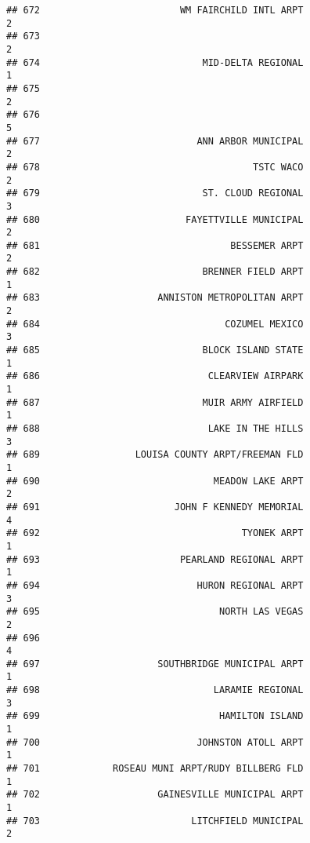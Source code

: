 \documentclass[
]{article}
\begin{document}
\begin{verbatim}
## 672                         WM FAIRCHILD INTL ARPT                           2
## 673                                                                          2
## 674                             MID-DELTA REGIONAL                           1
## 675                                                                          2
## 676                                                                          5
## 677                            ANN ARBOR MUNICIPAL                           2
## 678                                      TSTC WACO                           2
## 679                             ST. CLOUD REGIONAL                           3
## 680                          FAYETTVILLE MUNICIPAL                           2
## 681                                  BESSEMER ARPT                           2
## 682                             BRENNER FIELD ARPT                           1
## 683                     ANNISTON METROPOLITAN ARPT                           2
## 684                                 COZUMEL MEXICO                           3
## 685                             BLOCK ISLAND STATE                           1
## 686                              CLEARVIEW AIRPARK                           1
## 687                             MUIR ARMY AIRFIELD                           1
## 688                              LAKE IN THE HILLS                           3
## 689                 LOUISA COUNTY ARPT/FREEMAN FLD                           1
## 690                               MEADOW LAKE ARPT                           2
## 691                        JOHN F KENNEDY MEMORIAL                           4
## 692                                    TYONEK ARPT                           1
## 693                         PEARLAND REGIONAL ARPT                           1
## 694                            HURON REGIONAL ARPT                           3
## 695                                NORTH LAS VEGAS                           2
## 696                                                                          4
## 697                     SOUTHBRIDGE MUNICIPAL ARPT                           1
## 698                               LARAMIE REGIONAL                           3
## 699                                HAMILTON ISLAND                           1
## 700                            JOHNSTON ATOLL ARPT                           1
## 701             ROSEAU MUNI ARPT/RUDY BILLBERG FLD                           1
## 702                     GAINESVILLE MUNICIPAL ARPT                           1
## 703                           LITCHFIELD MUNICIPAL                           2

\end{verbatim}
\end{document}
